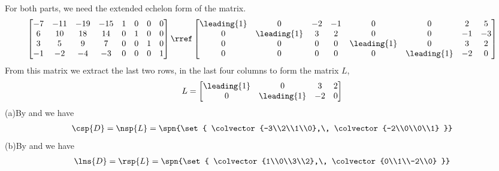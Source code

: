 For both parts, we need the extended echelon form of the matrix.
%
\begin{align*}
\begin{bmatrix}
 -7 & -11 & -19 & -15 & 1 & 0 & 0 & 0\\
 6 & 10 & 18 & 14 & 0 & 1 & 0 & 0 \\
 3 & 5 & 9 & 7 & 0 & 0 & 1 & 0 \\
 -1 & -2 & -4 & -3 & 0 & 0 & 0 & 1
\end{bmatrix}
\rref
\begin{bmatrix}
 \leading{1} & 0 & -2 & -1 & 0 & 0 & 2 & 5 \\
 0 & \leading{1} & 3 & 2 & 0 & 0 & -1 & -3 \\
 0 & 0 & 0 & 0 & \leading{1} & 0 & 3 & 2 \\
 0 & 0 & 0 & 0 & 0 & \leading{1} & -2 & 0
\end{bmatrix}
%
\end{align*}
%
From this matrix we extract the last two rows, in the last four columns to form the matrix $L$,
%
\begin{align*}
L
=
\begin{bmatrix}
\leading{1} & 0 & 3 & 2 \\
 0 & \leading{1} & -2 & 0
\end{bmatrix}
\end{align*}
%
(a)\quad By  and  we have
%
\begin{align*}
\csp{D}=\nsp{L}=\spn{\set{
\colvector{-3\\2\\1\\0},\,
\colvector{-2\\0\\0\\1}
}}
\end{align*}
%
(b)\quad  By  and  we have
%
\begin{align*}
\lns{D}=\rsp{L}=\spn{\set{
\colvector{1\\0\\3\\2},\,
\colvector{0\\1\\-2\\0}
}}
\end{align*}
%
